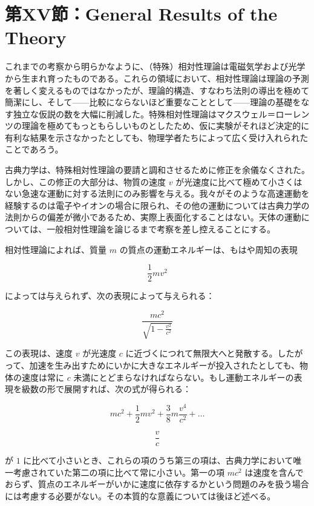\documentclass[a4paper,11pt,openany]{ltjsbook}
\begin{document}
\clearpage
\chapter{第XV節：General Results of the Theory}

これまでの考察から明らかなように、（特殊）相対性理論は電磁気学および光学から生まれ育ったものである。これらの領域において、相対性理論は理論の予測を著しく変えるものではなかったが、理論的構造、すなわち法則の導出を極めて簡潔にし、そして——比較にならないほど重要なこととして——理論の基礎をなす独立な仮説の数を大幅に削減した。特殊相対性理論はマクスウェル＝ローレンツの理論を極めてもっともらしいものとしたため、仮に実験がそれほど決定的に有利な結果を示さなかったとしても、物理学者たちによって広く受け入れられたことであろう。

古典力学は、特殊相対性理論の要請と調和させるために修正を余儀なくされた。しかし、この修正の大部分は、物質の速度 $v$ が光速度に比べて極めて小さくはない急速な運動に対する法則にのみ影響を与える。我々がそのような高速運動を経験するのは電子やイオンの場合に限られ、その他の運動については古典力学の法則からの偏差が微小であるため、実際上表面化することはない。天体の運動については、一般相対性理論を論じるまで考察を差し控えることにする。

相対性理論によれば、質量 $m$ の質点の運動エネルギーは、もはや周知の表現



\[ \frac{1}{2} m v^2 \]



によっては与えられず、次の表現によって与えられる：



\[ \frac{m c^2}{\sqrt{1 - \frac{v^2}{c^2}}} \]



この表現は、速度 $v$ が光速度 $c$ に近づくにつれて無限大へと発散する。したがって、加速を生み出すためにいかに大きなエネルギーが投入されたとしても、物体の速度は常に $c$ 未満にとどまらなければならない。もし運動エネルギーの表現を級数の形で展開すれば、次の式が得られる：



\[ m c^2 + \frac{1}{2} m v^2 + \frac{3}{8} m \frac{v^4}{c^2} + \dots \]





\[ \frac{v}{c} \]



が $1$ に比べて小さいとき、これらの項のうち第三の項は、古典力学において唯一考慮されていた第二の項に比べて常に小さい。第一の項 $mc^2$ は速度を含んでおらず、質点のエネルギーがいかに速度に依存するかという問題のみを扱う場合には考慮する必要がない。その本質的な意義については後ほど述べる。
\end{document}
